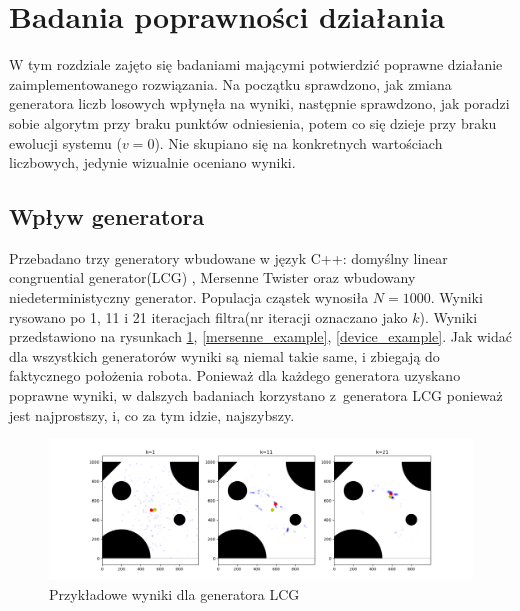 \section{Badania poprawności działania}
W tym rozdziale zajęto się badaniami mającymi potwierdzić poprawne działanie zaimplementowanego rozwiązania. Na początku sprawdzono, jak zmiana generatora liczb losowych wpłynęła na wyniki, następnie sprawdzono, jak poradzi sobie algorytm przy braku punktów odniesienia, potem co się dzieje przy braku ewolucji systemu ($v=0$). Nie skupiano się na konkretnych wartościach liczbowych, jedynie wizualnie oceniano wyniki.

\subsection{Wpływ generatora}
Przebadano trzy generatory wbudowane w język C++: domyślny linear congruential generator(LCG) \cite{lcg_wiki}, Mersenne Twister \cite{mersenne_wiki} oraz wbudowany niedeterministyczny generator. Populacja cząstek wynosiła $N=1000$. Wyniki rysowano po 1, 11 i 21 iteracjach filtra(nr iteracji oznaczano jako $k$). Wyniki przedstawiono na rysunkach \ref{lcg_example}, \ref{mersenne_example}, \ref{device_example}. Jak widać dla wszystkich generatorów wyniki są niemal takie same, i zbiegają do faktycznego położenia robota. Ponieważ dla każdego generatora uzyskano poprawne wyniki, w dalszych badaniach korzystano z~generatora LCG ponieważ jest najprostszy, i, co za tym idzie, najszybszy.

\begin{figure}[H]
	\begin{center}
		\includegraphics[width=15cm]{./lcg_example.png}
		\caption{Przykładowe wyniki dla generatora LCG}
		\label{lcg_example}
	\end{center}
\end{figure}


